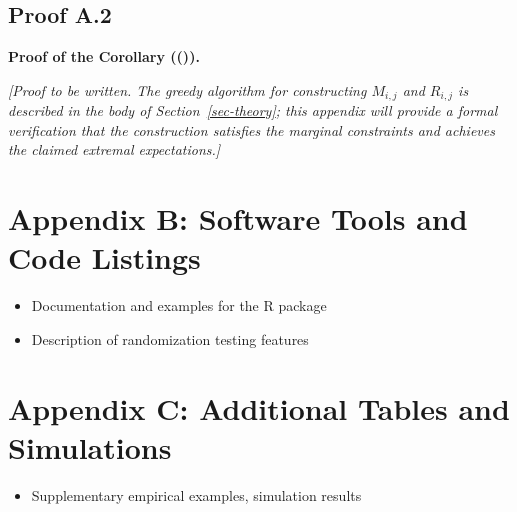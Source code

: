 \documentclass[
  12pt,
]{article}
\providecommand{\tightlist}{%
  \setlength{\itemsep}{0pt}\setlength{\parskip}{0pt}}
\theoremstyle{plain}
\theoremstyle{definition}
\theoremstyle{remark}
\begin{document}
\subsection{Proof A.2}\label{proof-cor-min}

\textbf{Proof of the Corollary
(()).}

\emph{{[}Proof to be written. The greedy algorithm for constructing
\(M_{i,j}\) and \(R_{i,j}\) is described in the body of
Section~\ref{sec-theory}; this appendix will provide a formal
verification that the construction satisfies the marginal constraints
and achieves the claimed extremal expectations.{]}}

\section{Appendix B: Software Tools and Code
Listings}\label{appendix-b-software-tools-and-code-listings}

\begin{itemize}
\tightlist
\item
  Documentation and examples for the R package\\
\item
  Description of randomization testing features
\end{itemize}

\section{Appendix C: Additional Tables and
Simulations}\label{appendix-c-additional-tables-and-simulations}

\begin{itemize}
\tightlist
\item
  Supplementary empirical examples, simulation results
\end{itemize}
\end{document}
